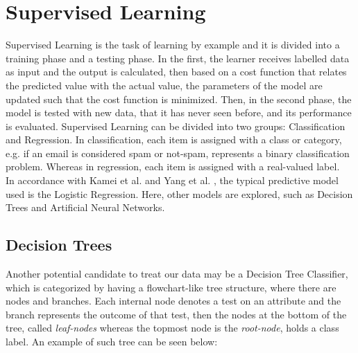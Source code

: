 
\chapter{Supervised Learning}

Supervised Learning is the task of learning by example and it is divided into a training phase and a testing phase. In the first, the learner receives labelled data as input and the output is calculated, then based on a cost function that relates the predicted value with the actual value, the parameters of the model are updated such that the cost function is minimized. Then, in the second phase, the model is tested with new data, that it has never seen before, and its performance is evaluated. 
Supervised Learning can be divided into two groups: Classification and Regression. In classification, each item is assigned with a class or category, e.g. if an email is considered spam or not-spam, represents a binary classification problem. Whereas in regression, each item is assigned with a real-valued label. \cite{HanDataMining}
\\

In accordance with Kamei et al. \cite{kameiJIT} and Yang et al. \cite{yangJIT}, the typical predictive model used is the Logistic Regression. Here, other models are explored, such as Decision Trees and Artificial Neural Networks.

\section{Decision Trees}

Another potential candidate to treat our data may be a Decision Tree Classifier, which is categorized by having a flowchart-like tree structure, where there are nodes and branches. Each internal node denotes a test on an attribute and the branch represents the outcome of that test, then the nodes at the bottom of the tree, called \textit{leaf-nodes} whereas the topmost node is the \textit{root-node}, holds a class label. An example of such tree can be seen below\cite{HanDataMining}:

